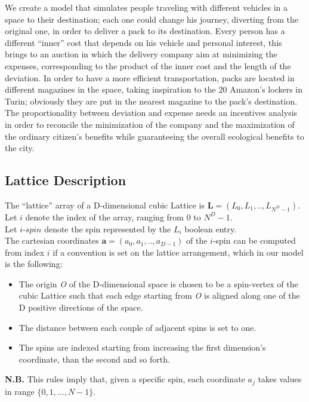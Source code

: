 \documentclass[11pt,a4paper]{article}
\begin{document}
We create a model that simulates people traveling with different vehicles in a space to their destination; each one could change his journey, diverting from the original one, in order to deliver a pack to its destination. 
Every person has a different “inner'' cost that depends on his vehicle and personal interest, this brings to an auction in which the delivery company aim at minimizing the expenses, corresponding to the product of the inner cost and the length of the deviation. 
In order to have a more efficient transportation, packs are located in different magazines in the space, taking inspiration to the 20 Amazon's lockers in Turin; obviously they are put in the nearest magazine to the pack's destination. 
The proportionality between deviation and expense needs an incentives analysis in order to reconcile the minimization of the company and the maximization of the ordinary citizen's benefits while guaranteeing the overall ecological benefits to the city.

\newpage
\subsection{Lattice Description}

The “lattice” array of a D-dimensional cubic Lattice is $\mathbf{L} = (L_0,L_1,..,L_{N^D-1})$.
Let $i$ denote the index of the array, ranging from $0$ to $N^D-1$.\\
Let $i$-$spin$ denote the spin represented by the $L_i$ boolean entry. \\
The cartesian coordinates $\mathbf{a} = (a_0,a_1,..,a_{D-1})$ of the $i$-spin can be computed from index $i$ if a convention is set on the lattice arrangement, which in our model is the following: 
\begin{itemize}
	\item The origin \textit{O} of the D-dimensional space is chosen to be a spin-vertex of the cubic Lattice such that each edge starting from \textit{O} is aligned along one of the D positive directions of the space. 
	\item The distance between each couple of adjacent spins is set to one. 
	\item The spins are indexed starting from increasing the first dimension’s coordinate, than the second and so forth.
\end{itemize}


\textbf{N.B.} This rules imply that, given a specific spin, each coordinate $a_j$ takes values in range 
$\{0,1,…,N-1\}$. \\ 
\end{document}
